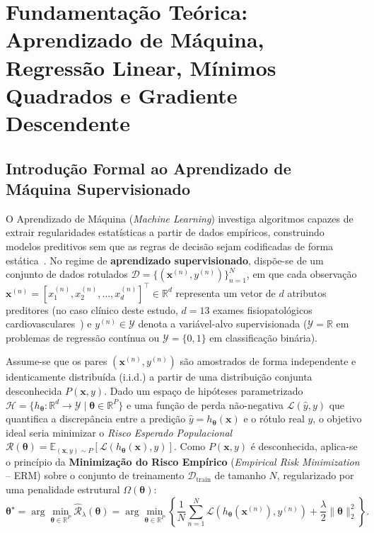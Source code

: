 \documentclass[runningheads]{llncs}
\begin{document}
\section{Fundamenta\c{c}\~{a}o Te\'{o}rica: Aprendizado de M\'{a}quina, Regress\~{a}o Linear, M\'{i}nimos Quadrados e Gradiente Descendente}
\label{sec:fundamentacao}

\subsection{Introdu\c{c}\~{a}o Formal ao Aprendizado de M\'{a}quina Supervisionado}
O Aprendizado de M\'{a}quina (\textit{Machine Learning}) investiga algoritmos capazes de extrair regularidades estat\'{i}sticas a partir de dados emp\'{i}ricos, construindo modelos preditivos sem que as regras de decis\~{a}o sejam codificadas de forma est\'{a}tica~\cite{goodfellow2016deep}. No regime de \textbf{aprendizado supervisionado}, disp\~{o}e-se de um conjunto de dados rotulados $\mathcal{D} = \{(\mathbf{x}^{(n)}, y^{(n)})\}_{n=1}^{N}$, em que cada observa\c{c}\~{a}o $\mathbf{x}^{(n)} = [x_1^{(n)}, x_2^{(n)}, \dots, x_d^{(n)}]^\top \in \mathbb{R}^d$ representa um vetor de $d$ atributos preditores (no caso cl\'{i}nico deste estudo, $d = 13$ exames fisiopatol\'{o}gicos cardiovasculares~\cite{detrano1989international}) e $y^{(n)} \in \mathcal{Y}$ denota a vari\'{a}vel-alvo supervisionada ($\mathcal{Y} = \mathbb{R}$ em problemas de regress\~{a}o cont\'{i}nua ou $\mathcal{Y} = \{0, 1\}$ em classifica\c{c}\~{a}o bin\'{a}ria).

Assume-se que os pares $(\mathbf{x}^{(n)}, y^{(n)})$ s\~{a}o amostrados de forma independente e identicamente distribu\'{i}da (i.i.d.) a partir de uma distribui\c{c}\~{a}o conjunta desconhecida $P(\mathbf{x}, y)$. Dado um espa\c{c}o de hip\'{o}teses parametrizado $\mathcal{H} = \{h_{\boldsymbol{\theta}} : \mathbb{R}^d \to \mathcal{Y} \mid \boldsymbol{\theta} \in \mathbb{R}^P\}$ e uma fun\c{c}\~{a}o de perda n\~{a}o-negativa $\mathcal{L}(\hat{y}, y)$ que quantifica a discrep\^{a}ncia entre a predi\c{c}\~{a}o $\hat{y} = h_{\boldsymbol{\theta}}(\mathbf{x})$ e o r\'{o}tulo real $y$, o objetivo ideal seria minimizar o \textit{Risco Esperado Populacional} $\mathcal{R}(\boldsymbol{\theta}) = \mathbb{E}_{(\mathbf{x}, y) \sim P}[\mathcal{L}(h_{\boldsymbol{\theta}}(\mathbf{x}), y)]$. Como $P(\mathbf{x}, y)$ \'{e} desconhecida, aplica-se o princ\'{i}pio da \textbf{Minimiza\c{c}\~{a}o do Risco Emp\'{i}rico} (\textit{Empirical Risk Minimization} -- ERM) sobre o conjunto de treinamento $\mathcal{D}_{\text{train}}$ de tamanho $N$, regularizado por uma penalidade estrutural $\Omega(\boldsymbol{\theta})$:
\begin{equation}
    \boldsymbol{\theta}^\star = \arg\min_{\boldsymbol{\theta} \in \mathbb{R}^P} \hat{\mathcal{R}}_{\lambda}(\boldsymbol{\theta}) = \arg\min_{\boldsymbol{\theta} \in \mathbb{R}^P} \left\{ \frac{1}{N} \sum_{n=1}^{N} \mathcal{L}\!\left(h_{\boldsymbol{\theta}}(\mathbf{x}^{(n)}), y^{(n)}\right) + \frac{\lambda}{2}\|\boldsymbol{\theta}\|_2^2 \right\}.
    \label{eq:erm}
\end{equation}
\end{document}
